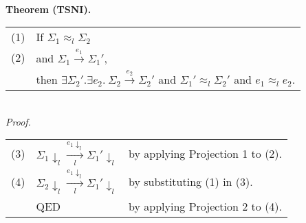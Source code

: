 \documentclass{article}
\newcommand{\ssteparrow}[1]{\overset{#1}{\longrightarrow}}
\newcommand{\sstep}[3]{#2\ssteparrow{#1}#3}
\newcommand{\lssteparrow}[2]{\overset{#2}{\underset{#1}{\longrightarrow}}}
\newcommand{\lsstep}[4]{#3\lssteparrow{#1}{#2}#4}
\newcommand{\proj}[2]{#1{\downarrow_{#2}}}
\newcommand{\lequiv}[3]{#2\approx_{#1}#3}
\begin{document}
\\
\textbf{Theorem (TSNI).}
\\
\begin{tabular}{l@{$\qquad$}l}
  (1) & If $\lequiv{l}{\Sigma_1}{\Sigma_2}$
\\
  (2) & and $\sstep{e_1}{\Sigma_1}{\Sigma_1'}$,
\\
      & then $\exists \Sigma_2'.\exists e_2.~\sstep{e_2}{\Sigma_2}{\Sigma_2'}$
        and $\lequiv{l}{\Sigma_1'}{\Sigma_2'}$
        and $\lequiv{l}{e_1}{e_2}$.
\end{tabular}
\\
\textit{Proof.}
\\
\begin{tabular}{l@{$\qquad$}l@{\qquad}l}
  (3) & $\lsstep{l}{\proj{e_1}{l}}{\proj{\Sigma_1}{l}}{\proj{\Sigma_1'}{l}}$
      & by applying Projection 1 to (2).
\\
  (4) & $\lsstep{l}{\proj{e_1}{l}}{\proj{\Sigma_2}{l}}{\proj{\Sigma_1'}{l}}$
      & by substituting (1) in (3).
\\
      & QED
      & by applying Projection 2 to (4).
\end{tabular}
\end{document}
